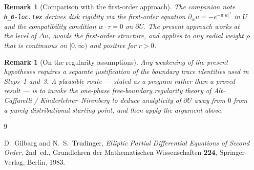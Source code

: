 \documentclass[11pt]{article}
\newtheorem{remark}[theorem]{Remark}
\newcommand{\1}{\mathbf{1}}
\begin{document}
\begin{remark}[Comparison with the first-order approach]
  The companion note \texttt{h\_0-loc.tex} derives disk rigidity via the first-order equation
  $\partial_w u=-e^{-\pi|w|^2}$ in $U$ and the compatibility condition $w\cdot\tau=0$ on
  $\partial U$.  The present approach works at the level of $\Delta u$, avoids the first-order
  structure, and applies to any radial weight $\rho$ that is continuous on $[0,\infty)$ and
  positive for $r>0$.
\end{remark}

\begin{remark}[On the regularity assumptions]
  Any weakening of the present hypotheses requires a separate justification of the boundary
  trace identities used in Steps~1 and~3.  A plausible route --- stated as a program rather
  than a proved result --- is to invoke the one-phase free-boundary regularity theory of
  Alt--Caffarelli / Kinderlehrer--Nirenberg to deduce analyticity of $\partial U$ away from $0$
  from a purely distributional starting point, and then apply the argument above.
\end{remark}

\begin{thebibliography}{9}

D.~Gilbarg and N.~S.~Trudinger,
\emph{Elliptic Partial Differential Equations of Second Order},
2nd~ed., Grundlehren der Mathematischen Wissenschaften \textbf{224},
Springer-Verlag, Berlin, 1983.

\end{thebibliography}
\end{document}
